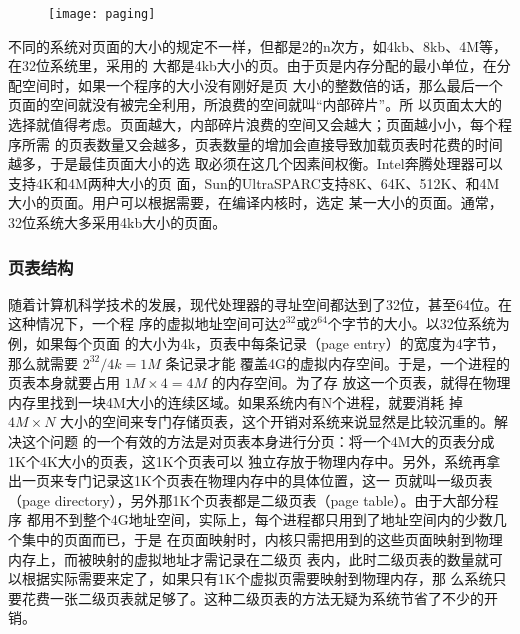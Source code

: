 \documentclass{swfcthesismscctex}
\begin{document}
\begin{figure}[!ht]
  \centering
  \begin{center}
    \texttt{[image: paging]}
  \end{center}
  \label{fig:paging}
\end{figure}

不同的系统对页面的大小的规定不一样，但都是2的n次方，如4kb、8kb、4M等，在32位系统里，采用的
大都是4kb大小的页。由于页是内存分配的最小单位，在分配空间时，如果一个程序的大小没有刚好是页
大小的整数倍的话，那么最后一个页面的空间就没有被完全利用，所浪费的空间就叫``内部碎片''。所
以页面太大的选择就值得考虑。页面越大，内部碎片浪费的空间又会越大；页面越小小，每个程序所需
的页表数量又会越多，页表数量的增加会直接导致加载页表时花费的时间越多，于是最佳页面大小的选
取必须在这几个因素间权衡。Intel奔腾处理器可以支持4K和4M两种大小的页
面，Sun的UltraSPARC支持8K、64K、512K、和4M大小的页面。用户可以根据需要，在编译内核时，选定
某一大小的页面\cite{silberschatz11essentials}。通常，32位系统大多采用4kb大小的页面。

\subsubsection{页表结构}

随着计算机科学技术的发展，现代处理器的寻址空间都达到了32位，甚至64位。在这种情况下，一个程
序的虚拟地址空间可达$2^{32}$或$2^{64}$个字节的大小\cite{zos}。以32位系统为例，如果每个页面
的大小为4k，页表中每条记录（page entry）的宽度为4字节，那么就需要 $2^{32}/4k=1M$ 条记录才能
覆盖4G的虚拟内存空间。于是，一个进程的页表本身就要占用 $1M\times 4 = 4M$ 的内存空间。为了存
放这一个页表，就得在物理内存里找到一块4M大小的连续区域。如果系统内有N个进程，就要消耗
掉 $4M\times{}N$ 大小的空间来专门存储页表，这个开销对系统来说显然是比较沉重的。解决这个问题
的一个有效的方法是对页表本身进行分页：将一个4M大的页表分成1K个4K大小的页表，这1K个页表可以
独立存放于物理内存中。另外，系统再拿出一页来专门记录这1K个页表在物理内存中的具体位置，这一
页就叫一级页表（page directory），另外那1K个页表都是二级页表（page table）。由于大部分程序
都用不到整个4G地址空间，实际上，每个进程都只用到了地址空间内的少数几个集中的页面而已，于是
在页面映射时，内核只需把用到的这些页面映射到物理内存上，而被映射的虚拟地址才需记录在二级页
表内，此时二级页表的数量就可以根据实际需要来定了，如果只有1K个虚拟页需要映射到物理内存，那
么系统只要花费一张二级页表就足够了。这种二级页表的方法无疑为系统节省了不少的开销。
\end{document}
